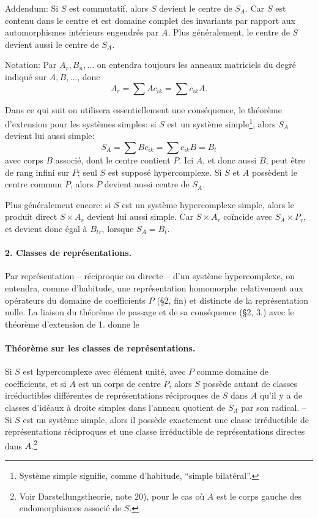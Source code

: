Addendum: Si \(S\) est commutatif, alors \(S\) devient le centre de \(S_A\). Car \(S\) est contenu dans le centre et est domaine complet des invariants par rapport aux automorphismes intérieurs engendrés par \(A\). Plus généralement, le centre de \(S\) devient aussi le centre de \(S_A\).

Notation: Par \(A_r,B_n,\ldots\) on entendra toujours les anneaux matriciels du degré indiqué sur \(A,B,\ldots\), donc
\[
        A_r=\sum A c_{ik}=\sum c_{ik}A.
\]

Dans ce qui suit on utilisera essentiellement une conséquence, le théorème d'extension pour les systèmes simples: si \(S\) est un système simple\footnote{Système simple signifie, comme d'habitude, ``simple bilatéral''.}, alors \(S_A\) devient lui aussi simple:
\[
        S_A=\sum B c_{ik}=\sum c_{ik}B=B_t
\]
avec corps \(B\) associé, dont le centre contient \(P\). Ici \(A\), et donc aussi \(B\), peut être de rang infini sur \(P\); seul \(S\) est supposé hypercomplexe. Si \(S\) et \(A\) possèdent le centre commun \(P\), alors \(P\) devient aussi centre de \(S_A\).

Plus généralement encore: si \(S\) est un système hypercomplexe simple, alors le produit direct \(S\times A_r\) devient lui aussi simple. Car \(S\times A_r\) coïncide avec \(S_A\times P_r\), et devient donc égal à \(B_{tr}\), lorsque \(S_A=B_t\).

\paragraph{2. Classes de représentations.}
Par représentation -- réciproque ou directe -- d'un système hypercomplexe, on entendra, comme d'habitude, une représentation homomorphe relativement aux opérateurs du domaine de coefficients \(P\) (\S 2, fin) et distincte de la représentation nulle. La liaison du théorème de passage et de sa conséquence (\S 2, 3.) avec le théorème d'extension de 1. donne le

\paragraph{Théorème sur les classes de représentations.}
Si \(S\) est hypercomplexe avec élément unité, avec \(P\) comme domaine de coefficients, et si \(A\) est un corps de centre \(P\), alors \(S\) possède autant de classes irréductibles différentes de représentations réciproques de \(S\) dans \(A\) qu'il y a de classes d'idéaux à droite simples dans l'anneau quotient de \(S_A\) par son radical. -- Si \(S\) est un système simple, alors il possède exactement une classe irréductible de représentations réciproques et une classe irréductible de représentations directes dans \(A\).\footnote{Voir Darstellungstheorie, note 20), pour le cas où \(A\) est le corps gauche des endomorphismes associé de \(S\).}

